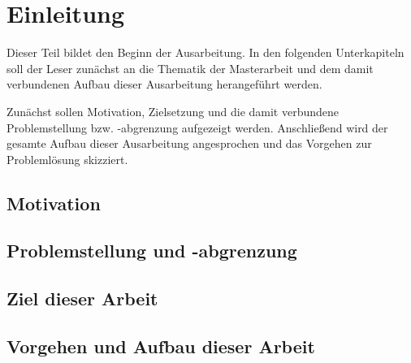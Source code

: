 \section{Einleitung}
\label{subsec:Einleitung}
\label{subsecmin:Einleitung}

Dieser Teil bildet den Beginn der Ausarbeitung.
In den folgenden Unterkapiteln soll der Leser zunächst an die Thematik der Masterarbeit und dem damit verbundenen Aufbau dieser Ausarbeitung herangeführt werden.

Zunächst sollen Motivation, Zielsetzung und die damit verbundene Problemstellung bzw. -abgrenzung aufgezeigt werden.
Anschließend wird der gesamte Aufbau dieser Ausarbeitung angesprochen und das Vorgehen zur Problemlösung skizziert.

\subsection{Motivation}
\label{subsec:Motivation}
\label{subsecmin:Motivation}


\subsection{Problemstellung und -abgrenzung}
\label{subsec:Problemstellung und -abgrenzung}
\label{subsecmin:Problemstellung und -abgrenzung}


\subsection{Ziel dieser Arbeit}
\label{subsec:Ziele dieser Arbeit}
\label{subsecmin:Ziele dieser Arbeit}


\subsection{Vorgehen und Aufbau dieser Arbeit}
\label{subsec:Uber diese Ausarbeitung}
\label{subsecmin:Uber diese Ausarbeitung}
